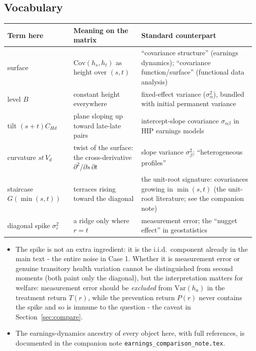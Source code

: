 \documentclass[11pt]{article}
\theoremstyle{remark}
\newcommand{\Var}{\mathrm{Var}}
\newcommand{\Cov}{\mathrm{Cov}}
\begin{document}
\subsection*{Vocabulary}

\begin{center}
\small
\begin{tabular}{@{}p{2.6cm}p{5.2cm}p{5.6cm}@{}}
\toprule
\textbf{Term here} & \textbf{Meaning on the matrix} & \textbf{Standard counterpart} \\
\midrule
surface & $\Cov(h_s,h_t)$ as height over $(s,t)$ & ``covariance structure'' (earnings
dynamics); ``covariance function/surface'' (functional data analysis) \\
level $B$ & constant height everywhere & fixed-effect variance ($\sigma^2_\alpha$), bundled
with initial permanent variance \\
tilt $(s+t)C_{Hd}$ & plane sloping up toward late-late pairs & intercept-slope covariance
$\sigma_{\alpha\beta}$ in HIP earnings models \\
curvature $st\,V_d$ & twist of the surface: the cross-derivative
$\partial^2/\partial s\,\partial t$ & slope variance $\sigma^2_\beta$; ``heterogeneous
profiles'' \\
staircase $G(\min(s,t))$ & terraces rising toward the diagonal & the unit-root signature:
covariances growing in $\min(s,t)$ (the unit-root literature; see the companion note) \\
diagonal spike $\sigma^2_\varepsilon$ & a ridge only where $r=t$ & measurement error; the
``nugget effect'' in geostatistics \\
\bottomrule
\end{tabular}
\end{center}

\begin{itemize}
\item The spike is not an extra ingredient: it is the i.i.d.\ component already in the main text - the entire noise in Case 1.
Whether it is measurement error or genuine transitory health variation cannot be distinguished from second moments (both paint only the diagonal), but the interpretation matters for welfare: measurement error should be \emph{excluded} from $\Var(h_a)$ in the treatment return $T(r)$, while the prevention return $P(r)$ never contains the spike and so is immune to the question - the caveat in Section~\ref{sec:compare}.
\item The earnings-dynamics ancestry of every object here, with full references, is documented in the companion note \texttt{earnings\_comparison\_note.tex}.
\end{itemize}
\end{document}
